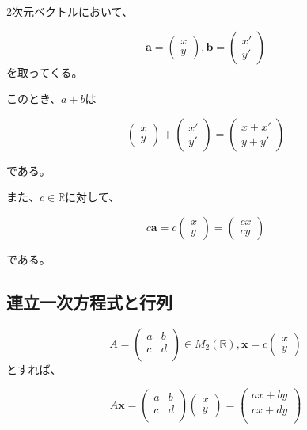 \documentclass[dvipdfmx,autodetect-engine]{jsarticle}
\begin{document}
2次元ベクトルにおいて、

$$
\bm{a} = \begin{pmatrix}
x \\
y
\end{pmatrix},
\bm{b} = \begin{pmatrix}
x' \\
y'
\end{pmatrix}
$$
を取ってくる。

このとき、$a + b$は

$$
\begin{pmatrix}
x \\
y
\end{pmatrix} + 
\begin{pmatrix}
x' \\
y'
\end{pmatrix}
= \begin{pmatrix}
x + x' \\
y + y'
\end{pmatrix}
$$

である。

また、$c \in \mathbb{R}$に対して、

$$
c\bm{a} =
c\begin{pmatrix}
x \\
y
\end{pmatrix}
= \begin{pmatrix}
cx \\
cy
\end{pmatrix}
$$

である。

\subsection{連立一次方程式と行列}

$$
A = \begin{pmatrix}
a & b \\
c & d \\
\end{pmatrix} \in M_2(\mathbb{R}),
\bm{x} = c\begin{pmatrix}
x \\
y
\end{pmatrix}
$$
とすれば、

$$
A\bm{x} = \begin{pmatrix}
a & b \\
c & d \\
\end{pmatrix}
\begin{pmatrix}
x \\
y
\end{pmatrix}
= \begin{pmatrix}
ax + by \\
cx + dy \\
\end{pmatrix}
$$
\end{document}

